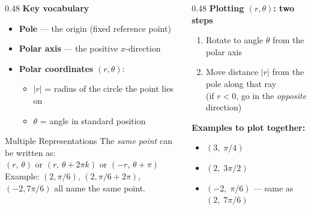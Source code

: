 \documentclass[aspectratio=169, 11pt]{beamer}
\begin{document}
\begin{frame}[t, plain]

  \begin{columns}[T]
    \begin{column}{0.48\textwidth}
      \textbf{Key vocabulary}
      \begin{itemize}
        \item \textbf{Pole} --- the origin (fixed reference point)
        \item \textbf{Polar axis} --- the positive $x$-direction
        \item \textbf{Polar coordinates} $(r,\theta)$:
          \begin{itemize}
            \item $|r|$ = radius of the circle the point lies on
            \item $\theta$ = angle in standard position
          \end{itemize}
      \end{itemize}

      \vspace{0.3cm}
      \begin{block}{Multiple Representations}
        The \emph{same point} can be written as:\\[4pt]
        $(r,\,\theta)$ \quad or \quad $(r,\,\theta + 2\pi k)$ \quad or \quad $(-r,\,\theta+\pi)$\\[4pt]
        \small Example: $(2,\pi/6)$, $(2,\pi/6+2\pi)$, $(-2, 7\pi/6)$ all name the same point.
      \end{block}
    \end{column}

    \begin{column}{0.48\textwidth}
      \textbf{Plotting $(r,\theta)$: two steps}
      \begin{enumerate}
        \item Rotate to angle $\theta$ from the polar axis
        \item Move distance $|r|$ from the pole along that ray\\
          (if $r < 0$, go in the \emph{opposite} direction)
      \end{enumerate}

      \vspace{0.4cm}
      \textbf{Examples to plot together:}
      \begin{itemize}
        \item $(3,\; \pi/4)$
        \item $(2,\; 3\pi/2)$
        \item $(-2,\; \pi/6)$ --- same as $(2,\; 7\pi/6)$
      \end{itemize}
    \end{column}
  \end{columns}
\end{frame}
\end{document}
